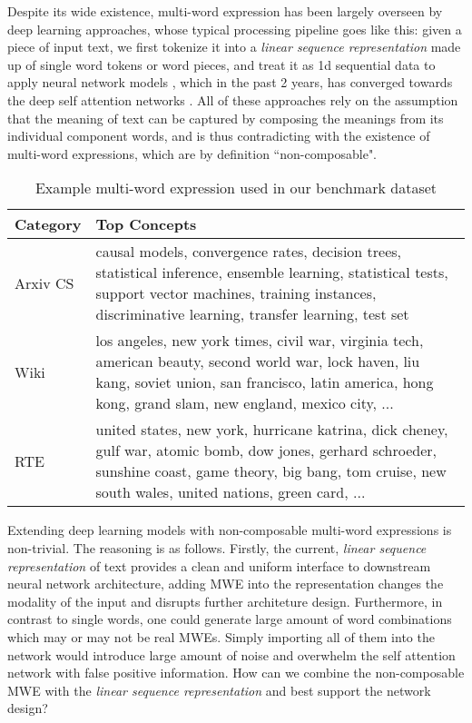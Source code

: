 
Despite its wide existence, multi-word expression has been largely overseen by deep learning approaches, 
whose typical processing pipeline goes like this:
given a piece of input text, 
we first tokenize it into a \textit{linear sequence representation} made up of single word tokens or word pieces,
and treat it as 1d sequential data to apply neural network models \cite{collobert2011natural, zhou2016attention, devlin2018bert}, which in the past 2 years, has converged towards the deep self attention networks \cite{vaswani2017attention}. 
All of these approaches rely on the assumption that the meaning of text can be captured by composing the meanings from its individual component words, 
and is thus contradicting with the existence of multi-word expressions, which are by definition ``non-composable".


\begin{table}
\centering
\caption{Example multi-word expression used in our benchmark dataset}\label{tab:dataset-stats}

\begin{tabular}{ll}
\toprule
\textbf{Category}  & \textbf{Top Concepts} \\
\midrule
Arxiv CS & \multicolumn{1}{p{.35\textwidth}}{\raggedright causal models, convergence rates, decision trees, statistical inference, ensemble learning, statistical tests, support vector machines, training instances, discriminative learning, transfer learning, test set
} \\
\midrule
Wiki & \multicolumn{1}{p{.35\textwidth}}{\raggedright los angeles, new york times, civil war, virginia tech, american beauty, second world war, lock haven, liu kang, soviet union, san francisco, latin america, hong kong, grand slam, new england, mexico city, ...
}  \\
\bottomrule
RTE & \multicolumn{1}{p{.35\textwidth}}{\raggedright united states, new york, hurricane katrina, dick cheney, gulf war, atomic bomb, dow jones, gerhard schroeder, sunshine coast, game theory, big bang, tom cruise, new south wales, united nations, green card, ...
}  \\
\bottomrule
\end{tabular}
\label{tab-examplar}
\end{table}

Extending deep learning models with non-composable multi-word expressions is non-trivial. 
The reasoning is as follows. 
Firstly, the current, \textit{linear sequence representation} of text provides a clean and uniform interface to downstream neural network architecture, 
adding MWE into the representation changes the modality of the input and disrupts further architeture design. 
Furthermore, in contrast to single words,  one could generate large amount of word combinations which may or may not be real MWEs. 
Simply importing all of them into the network would introduce large amount of noise and overwhelm the self attention network with false positive information. 
How can we combine the non-composable MWE with the \textit{linear sequence representation} and best support the network design?


